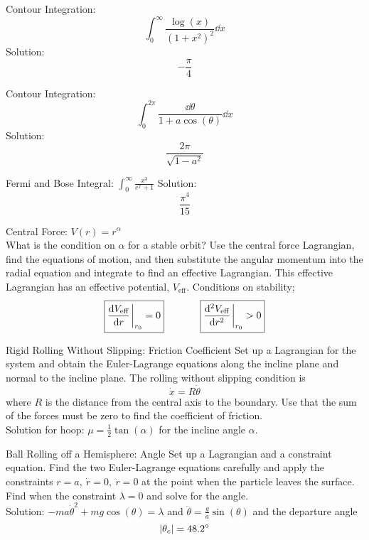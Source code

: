 \documentclass[avery5371,grid]{flashcards}
\begin{document}
\begin{flashcard}[Problem]{Contour Integration: $$\int^{\infty}_{0} \frac{\log(x)}{(1+x^2)^2}\dd x$$}
	Solution: $$-\frac{\pi}{4}$$
\end{flashcard}

\begin{flashcard}[Problem]{Contour Integration: $$\int_{0}^{2\pi} \frac{\dd\theta}{1+a\cos(\theta)}\dd x$$}
	Solution: $$\frac{2\pi}{\sqrt{1-a^2}}$$
\end{flashcard}

\begin{flashcard}[Problem]{Fermi and Bose Integral: $\int_0^\infty\frac{x^3}{e^x+1}$}
	Solution: $$\frac{\pi^4}{15}$$
\end{flashcard}

\begin{flashcard}[Problem]{Central Force: $V(r) = r^\alpha$\\What is the condition on $\alpha$ for a stable orbit?}
	Use the central force Lagrangian, find the equations of motion, and then substitute the angular momentum into the radial equation and integrate to find an effective Lagrangian. This effective Lagrangian has an effective potential, $V_\text{eff}$. Conditions on stability;
	\begin{align*}
		\boxed{\dv{V_\text{eff}}{r}\eval_{r_0} = 0}\hspace{.5in} \boxed{\dv[2]{V_\text{eff}}{r}\eval_{r_0} > 0}
	\end{align*}
\end{flashcard}

\begin{flashcard}[Problem]{Rigid Rolling Without Slipping: Friction Coefficient}
	Set up a Lagrangian for the system and obtain the Euler-Lagrange equations along the incline plane and normal to the incline plane. The rolling without slipping condition is 
	$$\dot{x} = R\dot{\theta}$$ where $R$ is the distance from the central axis to the boundary. Use that the sum of the forces must be zero to find the coefficient of friction. \\

	Solution for hoop: $\mu = \frac{1}{2}\tan(\alpha)$ for the incline angle $\alpha$.
\end{flashcard}

\begin{flashcard}[Problem]{Ball Rolling off a Hemisphere: Angle}
	Set up a Lagrangian and a constraint equation. Find the two Euler-Lagrange equations carefully and apply the constraints $r=a,\ \dot{r}=0,\ \ddot{r}=0$ at the point when the particle leaves the surface. Find when the constraint $\lambda=0$ and solve for the angle.\\

	Solution: $-ma\dot{\theta}^2 + mg\cos(\theta)=\lambda$ and $\ddot{\theta} = \frac{g}{a}\sin(\theta)$ and the departure angle $$\abs{\theta_c} = 48.2^{\circ}$$ 
\end{flashcard}
\end{document}
